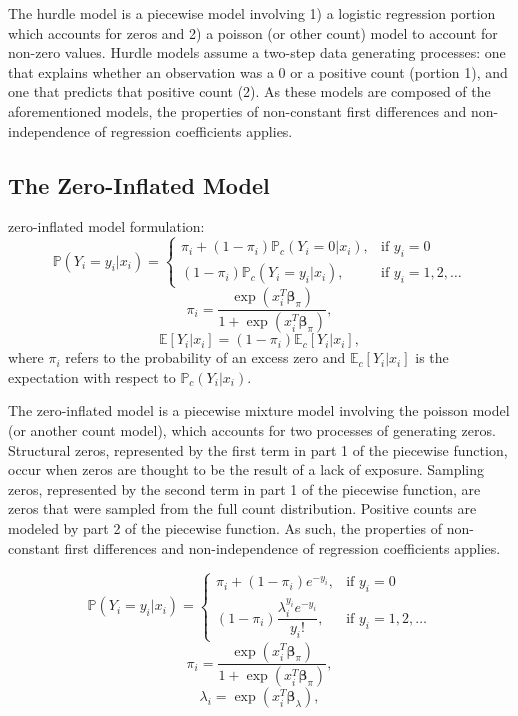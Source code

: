 \documentclass[jou, apacite]{apa6}
\begin{document}
The hurdle model is a piecewise model involving 1) a logistic regression portion which accounts for zeros and 2) a poisson (or other count) model to account for non-zero values. Hurdle models assume a two-step data generating processes: one that explains whether an observation was a 0 or a positive count (portion 1), and one that predicts that positive count (2). As these models are composed of the aforementioned models, the properties of non-constant first differences and non-independence of regression coefficients applies. 

\subsection{The Zero-Inflated Model}

zero-inflated model formulation:
\begin{equation}
\mathbb{P}(Y_i = y_i|x_i) =
  \begin{cases}
    \pi_i + (1 - \pi_i)\mathbb{P}_c(Y_i = 0|x_i), & \text{if } y_i = 0 \\
    (1 - \pi_i) \mathbb{P}_c(Y_i = y_i|x_i), & \text{if } y_i = 1, 2, \dots
  \end{cases}
\end{equation}
\begin{equation}
\pi_i = \dfrac{\exp (x_i^T \bm{\beta}_{\pi})}{1 + \exp (x_i^T \bm{\beta}_{\pi})},
\end{equation}
\begin{equation}
\mathbb{E}[Y_i|x_i] = (1 - \pi_i)\mathbb{E}_c[Y_i|x_i], %
\end{equation}
where $\pi_i$ refers to the probability of an excess zero and $\mathbb{E}_c[Y_i|x_i]$ is the expectation with respect to $\mathbb{P}_c(Y_i|x_i)$.

The zero-inflated model is a piecewise mixture model involving the poisson model (or another count model), which accounts for two processes of generating zeros. Structural zeros, represented by the first term in part 1 of the piecewise function, occur when zeros are thought to be the result of a lack of exposure. Sampling zeros, represented by the second term in part 1 of the piecewise function, are zeros that were sampled from the full count distribution. Positive counts are modeled by part 2 of the piecewise function. As such, the properties of non-constant first differences and non-independence of regression coefficients applies. 


\begin{equation} \label{zip1}
\mathbb{P}(Y_i = y_i|x_i) =
  \begin{cases}
    \pi_i + (1 - \pi_i)e^{-y_i}, & \text{if } y_i = 0 \\
    (1 - \pi_i) \dfrac{\lambda_i^{y_i}e^{-y_i}}{y_i!}, & \text{if } y_i = 1, 2, \dots
  \end{cases}
\end{equation}
\begin{equation} \label{zip2}
\pi_i = \dfrac{\exp (x_i^T \bm{\beta}_{\pi})}{1 + \exp (x_i^T \bm{\beta}_{\pi})},
\end{equation}
\begin{equation} \label{zip3}
\lambda_i = \exp (x_i^T \bm{\beta}_{\lambda}),
\end{equation}
\end{document}
